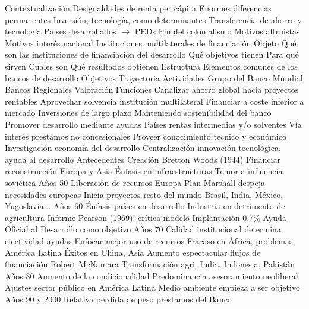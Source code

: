 \documentclass{nuevotema}
\begin{document}
\begin{esquemal}
	\1[] 
		\2 Contextualización
			\3 Desigualdades de renta per cápita
				\4 Enormes diferencias permanentes
				\4 Inversión, tecnología, como determinantes
			\3 Transferencia de ahorro y tecnología
				\4 Países desarrollados $\to$ PEDs
				\4 Fin del colonialismo
				\4 Motivos altruistas
				\4 Motivos interés nacional
			\3 Instituciones multilaterales de financiación
		\2 Objeto
			\3 Qué son las instituciones de financiación del desarrollo
			\3 Qué objetivos tienen
			\3 Para qué sirven
			\3 Cuáles son
			\3 Qué resultados obtienen
		\2 Estructura
			\3 Elementos comunes de los bancos de desarrollo
				\4 Objetivos
				\4 Trayectoria
				\4 Actividades
			\3 Grupo del Banco Mundial
			\3 Bancos Regionales
			\3 Valoración
	\1 
		\2 Funciones
			\3 Canalizar ahorro global hacia proyectos rentables
				\4[] Aprovechar solvencia institución multilateral
				\4[] Financiar a coste inferior a mercado
				\4[] Inversiones de largo plazo
				\4[] Manteniendo sostenibilidad del banco
			\3 Promover desarrollo mediante ayudas
				\4[] Países rentas intermedias y/o solventes
				\4[] Vía interés prestamos no concesionales
			\3 Proveer conocimiento técnico y económico
				\4[] Investigación economía del desarrollo
				\4[] Centralización innovación tecnológica, ayuda al desarrollo
		\2 Antecedentes
			\3 Creación Bretton Woods (1944)
				\4[] Financiar reconstrucción Europa y Asia
				\4[] Énfasis en infraestructuras
				\4[] Temor a influencia soviética
			\3 Años 50
				\4[] Liberación de recursos Europa
				\4[] Plan Marshall despeja necesidades europeas
				\4[] Inicia proyectos resto del mundo
				\4[] Brasil, India, México, Yugoslavia...
			\3 Años 60
				\4[] Énfasis países en desarrollo
				\4[] Industria en detrimento de agricultura
				\4[] Informe Pearson (1969): crítica modelo
				\4[] Implantación 0.7\% Ayuda Oficial al Desarrollo como objetivo
			\3 Años 70
				\4[] Calidad institucional determina efectividad ayudas
				\4[] Enfocar mejor uso de recursos
				\4[] Fracaso en África, problemas América Latina
				\4[] Éxitos en China, Asia
				\4[] Aumento espectacular flujos de financiación
				\4[] Robert McNamara
				\4[] Transformación agri. India, Indonesia, Pakistán
			\3 Años 80
				\4[] Aumento de la condicionalidad
				\4[] Predominancia asesoramiento neoliberal
				\4[] Ajustes sector público en América Latina
				\4[] Medio ambiente empieza a ser objetivo
			\3 Años 90 y 2000
				\4[] Relativa pérdida de peso préstamos del Banco

\end{esquemal}
\end{document}
